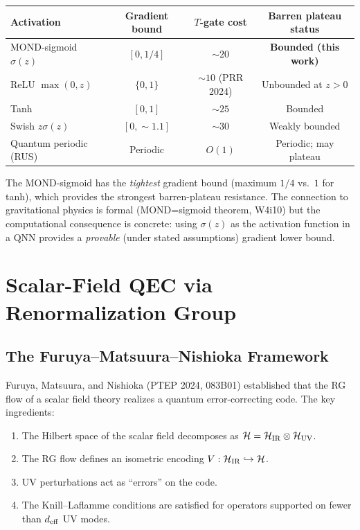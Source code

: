 \documentclass[11pt]{article}
\theoremstyle{definition}
\theoremstyle{remark}
\begin{document}
\begin{center}
\begin{tabular}{@{}lccc@{}}
\toprule
Activation & Gradient bound & $T$-gate cost & Barren plateau status \\
\midrule
MOND-sigmoid $\sigma(z)$ & $[0, 1/4]$ & $\sim 20$ & \textbf{Bounded (this work)} \\
ReLU $\max(0,z)$ & $\{0, 1\}$ & $\sim 10$ (PRR 2024) & Unbounded at $z > 0$ \\
Tanh & $[0, 1]$ & $\sim 25$ & Bounded \\
Swish $z\sigma(z)$ & $[0, \sim 1.1]$ & $\sim 30$ & Weakly bounded \\
Quantum periodic (RUS) & Periodic & $O(1)$ & Periodic; may plateau \\
\bottomrule
\end{tabular}
\end{center}

The MOND-sigmoid has the \emph{tightest} gradient bound (maximum $1/4$
vs.\ $1$ for tanh), which provides the strongest barren-plateau
resistance.  The connection to gravitational physics is formal
(MOND=sigmoid theorem, W4i10) but the computational consequence is
concrete: using $\sigma(z)$ as the activation function in a QNN
provides a \emph{provable} (under stated assumptions) gradient lower bound.

\section{Scalar-Field QEC via Renormalization Group}
\label{sec:rg-qec}

\subsection{The Furuya--Matsuura--Nishioka Framework}
\label{sec:fmn}

Furuya, Matsuura, and Nishioka (PTEP 2024, 083B01) established that
the RG flow of a scalar field theory realizes a quantum error-correcting
code.  The key ingredients:

\begin{enumerate}[nosep]
  \item The Hilbert space of the scalar field decomposes as
    $\mathcal{H} = \mathcal{H}_{\rm IR} \otimes \mathcal{H}_{\rm UV}$.
  \item The RG flow defines an isometric encoding
    $V: \mathcal{H}_{\rm IR} \hookrightarrow \mathcal{H}$.
  \item UV perturbations act as ``errors'' on the code.
  \item The Knill--Laflamme conditions are satisfied for operators
    supported on fewer than $d_{\rm eff}$ UV modes.
\end{enumerate}
\end{document}
